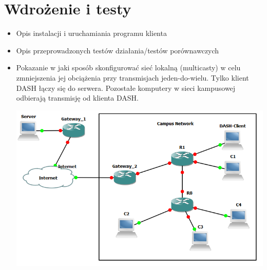 \chapter{Wdrożenie i testy}
\label{cha:rozdzial5}

\begin{itemize}
\item Opis instalacji i uruchamiania programu klienta
\item Opis przeprowadzonych testów działania/testów porównawczych
\item Pokazanie w jaki sposób skonfigurować sieć lokalną (multicasty) w celu zmniejszenia jej obciążenia przy transmisjach jeden-do-wielu. Tylko klient DASH łączy się do serwera. Pozostałe komputery w sieci kampusowej odbierają transmisję od klienta DASH.
\begin{center}
\includegraphics[scale=0.7]{lan}
\end{center}
\end{itemize}